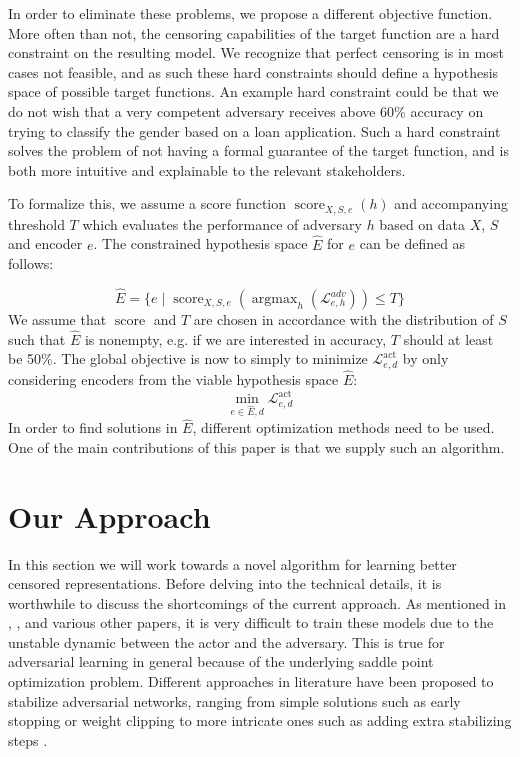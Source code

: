 \documentclass[nohyperref]{article}
\theoremstyle{plain}
\theoremstyle{definition}
\theoremstyle{remark}
\begin{document}
In order to eliminate these problems, we propose a different objective function. More often than not, the censoring capabilities of the target function are a hard constraint on the resulting model. We recognize that perfect censoring is in most cases not feasible, and as such these hard constraints should define a hypothesis space of possible target functions. An example hard constraint could be that we do not wish that a very competent adversary receives above 60\% accuracy on trying to classify the gender based on a loan application. Such a hard constraint solves the problem of not having a formal guarantee of the target function, and is both more intuitive and explainable to the relevant stakeholders.

To formalize this, we assume a score function $\mathop{score}_{X,S,e}(h)$ and accompanying threshold $T$ which evaluates the performance of adversary $h$ based on data $X$, $S$ and encoder $e$. The constrained hypothesis space $\hat{E}$ for $e$ can be defined as follows:

\[ \hat{E} =\{ e \mid \mathop{score}_{X,S,e}(\mathop{\arg\max}_h( \mathcal{L}^{adv}_{e,h})) \leq T \} \]
We assume that $\mathop{score}$ and $T$ are chosen in accordance with the distribution of $S$ such that $\hat{E}$ is nonempty, e.g. if we are interested in accuracy, $T$ should at least be 50\%. The global objective is now to simply to minimize $\mathcal{L}^{\mathop{act}}_{e,d}$ by only considering encoders from the viable hypothesis space $\hat{E}$:
\[ \min_{e \in \hat{E}, d} \mathcal{L}^{\mathop{act}}_{e,d} \]
In order to find solutions in $\hat{E}$, different optimization methods need to be used. One of the main contributions of this paper is that we supply such an algorithm.

\section{Our Approach}
\label{our_approach}
In this section we will work towards a novel algorithm for learning better censored representations. Before delving into the technical details, it is worthwhile to discuss the shortcomings of the current approach. As mentioned in \cite{edwards2016censoring}, \cite{pmlr-v80-madras18a}, and various other papers, it is very difficult to train these models due to the unstable dynamic between the actor and the adversary. This is true for adversarial learning in general because of the underlying saddle point optimization problem. Different approaches in literature have been proposed to stabilize adversarial networks, ranging from simple solutions such as early stopping or weight clipping \cite{pmlr-v70-arjovsky17a} to more intricate ones such as adding extra stabilizing steps \cite{yadav2018stabilizing}. 
\end{document}
